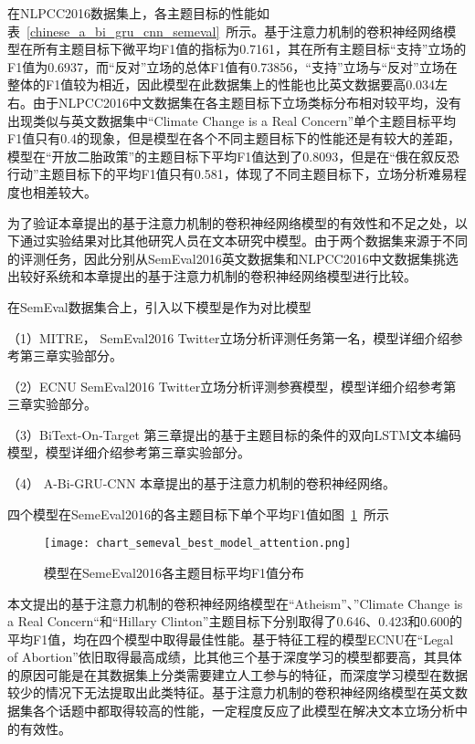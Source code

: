 在NLPCC2016数据集上，各主题目标的性能如表~\ref{chinese_a_bi_gru_cnn_semeval}~所示。基于注意力机制的卷积神经网络模型在所有主题目标下微平均F1值的指标为0.7161，其在所有主题目标“支持”立场的F1值为0.6937，而“反对”立场的总体F1值有0.73856，“支持”立场与“反对”立场在整体的F1值较为相近，因此模型在此数据集上的性能也比英文数据要高0.034左右。由于NLPCC2016中文数据集在各主题目标下立场类标分布相对较平均，没有出现类似与英文数据集中“Climate Change is a Real Concern”单个主题目标平均F1值只有0.4的现象，但是模型在各个不同主题目标下的性能还是有较大的差距，模型在“开放二胎政策”的主题目标下平均F1值达到了0.8093，但是在“俄在叙反恐行动”主题目标下的平均F1值只有0.581，体现了不同主题目标下，立场分析难易程度也相差较大。


为了验证本章提出的基于注意力机制的卷积神经网络模型的有效性和不足之处，以下通过实验结果对比其他研究人员在文本研究中模型。由于两个数据集来源于不同的评测任务，因此分别从SemEval2016英文数据集和NLPCC2016中文数据集挑选出较好系统和本章提出的基于注意力机制的卷积神经网络模型进行比较。

在SemEval数据集合上，引入以下模型是作为对比模型

（1）MITRE， SemEval2016 Twitter立场分析评测任务第一名，模型详细介绍参考第三章实验部分。

（2）ECNU   SemEval2016 Twitter立场分析评测参赛模型，模型详细介绍参考第三章实验部分。

（3）BiText-On-Target 第三章提出的基于主题目标的条件的双向LSTM文本编码模型，模型详细介绍参考第三章实验部分。

（4） A-Bi-GRU-CNN 本章提出的基于注意力机制的卷积神经网络。

四个模型在SemeEval2016的各主题目标下单个平均F1值如图~\ref{chart_semeval_best_model_attention}~所示
\begin{figure}[htbp]
	\centering
	\texttt{[image: chart\_semeval\_best\_model\_attention.png]}
	\caption[rnn_vanish]{模型在SemeEval2016各主题目标平均F1值分布}
	\label{chart_semeval_best_model_attention}
\end{figure}

本文提出的基于注意力机制的卷积神经网络模型在“Atheism”、”Climate Change is a Real Concern“和“Hillary Clinton”主题目标下分别取得了0.646、0.423和0.600的平均F1值，均在四个模型中取得最佳性能。基于特征工程的模型ECNU在“Legal of Abortion”依旧取得最高成绩，比其他三个基于深度学习的模型都要高，其具体的原因可能是在其数据集上分类需要建立人工参与的特征，而深度学习模型在数据较少的情况下无法提取出此类特征。基于注意力机制的卷积神经网络模型在英文数据集各个话题中都取得较高的性能，一定程度反应了此模型在解决文本立场分析中的有效性。

